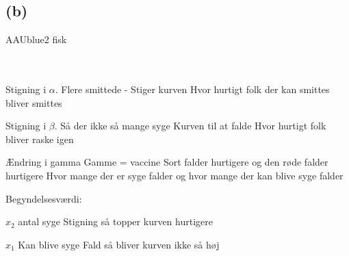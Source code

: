 \subsection*{(b) }
% 
%
\begin{color}{AAUblue2}
%
fisk
% 
\end{color}
\\\\
% 
%
Stigning i $\alpha$. 
Flere smittede - Stiger kurven 
Hvor hurtigt folk der kan smittes bliver smittes 

Stigning i $\beta$. 
Så der ikke så mange syge 
Kurven til at falde 
Hvor hurtigt folk bliver raske igen

Ændring i gamma 
Gamme = vaccine 
Sort falder hurtigere 
og den røde falder hurtigere
Hvor mange der er syge falder og hvor mange der kan blive syge falder 


Begyndelsesværdi: 

$x_2$ antal syge 
Stigning så topper kurven hurtigere
 
$x_1$ Kan blive syge 
Fald så bliver kurven ikke så høj 

%